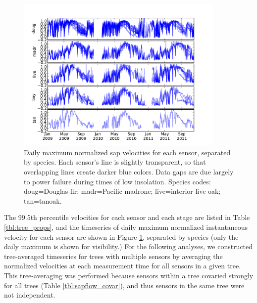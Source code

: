 \begin{figure}[here]
\includegraphics[width=0.9\textwidth]{ch1-sapflow/figures/Figure04.pdf}
\caption{Daily maximum normalized sap velocities for each sensor, separated by species.  Each sensor's line is slightly transparent, so that overlapping lines create darker blue colors.  Data gaps are due largely to power failure during times of low insolation.  Species codes: doug=Douglas-fir; madr=Pacific madrone; live=interior live oak; tan=tanoak.}
\label{fig:sapflow_normvel}
\end{figure}

The 99.5th percentile velocities for each sensor and each stage are listed in Table \ref{tbl:tree_props}, and the timeseries of daily maximum normalized instantaneous velocity for each sensor are shown in Figure \ref{fig:sapflow_normvel}, separated by species (only the daily maximum is shown for visibility.)  For the following analyses, we constructed tree-averaged timeseries for trees with multiple sensors by averaging the normalized velocities at each measurement time for all sensors in a given tree.  This tree-averaging was performed because sensors within a tree covaried strongly for all trees (Table \ref{tbl:sapflow_covar}), and thus sensors in the same tree were not independent.


